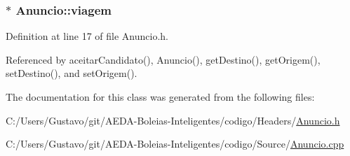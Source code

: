 \hypertarget{class_anuncio_aa225374a19420f56f5abc258d96b691a}{
\subsubsection[{viagem}]{$\ast$ Anuncio\+::viagem\hspace{0.3cm}{\ttfamily [private]}}}\label{class_anuncio_aa225374a19420f56f5abc258d96b691a}


Definition at line 17 of file Anuncio.\+h.



Referenced by aceitar\+Candidato(), Anuncio(), get\+Destino(), get\+Origem(), set\+Destino(), and set\+Origem().



The documentation for this class was generated from the following files\+:\begin{DoxyCompactItemize}
\item 
C\+:/\+Users/\+Gustavo/git/\+A\+E\+D\+A-\/\+Boleias-\/\+Inteligentes/codigo/\+Headers/\hyperlink{_anuncio_8h}{Anuncio.\+h}\item 
C\+:/\+Users/\+Gustavo/git/\+A\+E\+D\+A-\/\+Boleias-\/\+Inteligentes/codigo/\+Source/\hyperlink{_anuncio_8cpp}{Anuncio.\+cpp}\end{DoxyCompactItemize}
